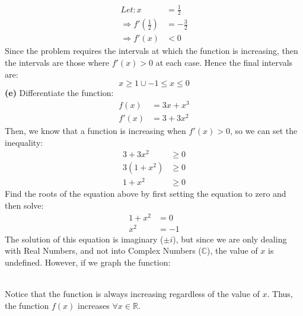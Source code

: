 \documentclass[hidelinks, a4paper, 12pt]{article}
\newcommand{\bd}{\textbf}
\newcommand{\n}{\\[\baselineskip]}
\newcommand{\real}{\mathbb{R}}
\newcommand{\thus}{\Rightarrow}
\begin{document}
                \[\begin{split}
                    Let: x &= \frac{1}{2}\\
                    \thus f'\left(\frac{1}{2}\right) &= -\frac{3}{2}\\
                    \thus f'(x) &< 0
                \end{split}\]
                Since the problem requires the intervals at which the function is increasing, then the intervals are those
                where $f'(x) > 0$ at each case. Hence the final intervals are:
                \[x \geq 1 \cup -1 \leq x \leq 0\]
                \bd{(e)} Differentiate the function:
                \[\begin{split}
                    f(x) &= 3x + x^3\\
                    f'(x) &= 3 + 3x^2
                \end{split}\]
                Then, we know that a function is increasing when $f'(x) > 0$, so we can set the inequality:
                \[\begin{split}
                    3 + 3x^2 &\geq 0\\
                    3(1 + x^2) &\geq 0\\
                    1 + x^2 &\geq 0
                \end{split}\]
                Find the roots of the equation above by first setting the equation to zero and then solve:
                \[\begin{split}
                    1 + x^2 &= 0\\
                    x^2 &= -1
                \end{split}\]
                The solution of this equation is imaginary ($\pm i$), but since we are only dealing with Real Numbers, and not
                into Complex Numbers ($\mathbb{C}$), the value of $x$ is undefined. However, if we graph the function:\n
                \n
                Notice that the function is always increasing regardless of the value of $x$. Thus,
                the function $f(x)$ increases $\forall x \in \real$.
    
\end{document}
